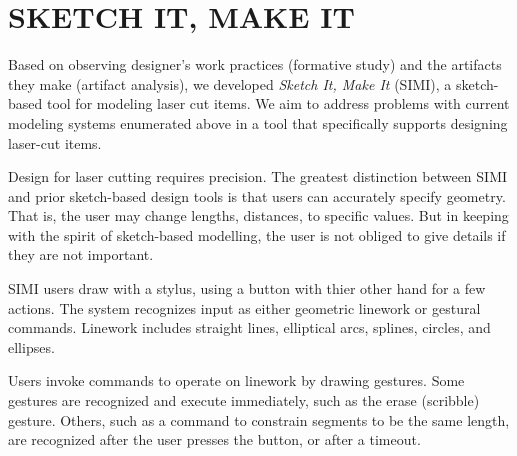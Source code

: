 \documentclass{article}
\begin{document}


\section{SKETCH IT, MAKE IT}

Based on observing designer's work practices (formative study) and the
artifacts they make (artifact analysis), we developed \textit{Sketch
  It, Make It} (SIMI), a sketch-based tool for modeling laser cut
items. We aim to address problems with current modeling systems
enumerated above in a tool that specifically supports designing
laser-cut items.

Design for laser cutting requires precision. The greatest distinction
between SIMI and prior sketch-based design tools is that users can
accurately specify geometry. That is, the user may change lengths,
distances, to specific values. But in keeping with the spirit of
sketch-based modelling, the user is not obliged to give details if
they are not important.


SIMI users draw with a stylus, using a button with thier other hand
for a few actions. The system recognizes input as either geometric
linework or gestural commands. Linework includes straight lines,
elliptical arcs, splines, circles, and ellipses.

Users invoke commands to operate on linework by drawing gestures. Some
gestures are recognized and execute immediately, such as the erase
(scribble) gesture. Others, such as a command to constrain segments to
be the same length, are recognized after the user presses the button,
or after a timeout.
\end{document}
